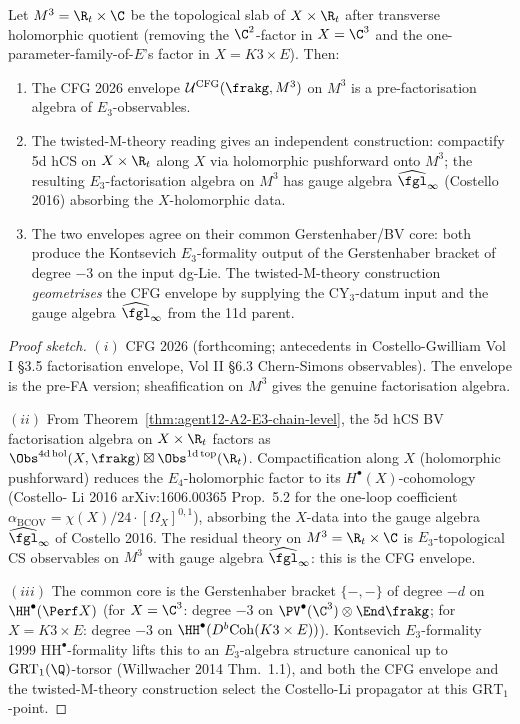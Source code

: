 \begin{proposition}
\label{prop:agent12-A6-cfg-coherence}
Let $M^3 = \R_t \times \C$ be the topological slab of $X \times \R_t$
after transverse holomorphic quotient (removing the $\C^2$-factor in
$X = \C^3$ and the one-parameter-family-of-$E$'s factor in
$X = K3 \times E$). Then:
\begin{enumerate}[label=\textup{(\roman*)}]
\item The CFG 2026 envelope $\mathcal{U}^{\mathrm{CFG}}(\frakg, M^3)$ on
$M^3$ is a pre-factorisation algebra of $E_3$-observables.
\item The twisted-M-theory reading gives an independent construction:
compactify 5d hCS on $X \times \R_t$ along $X$ via holomorphic
pushforward onto $M^3$; the resulting $E_3$-factorisation algebra on
$M^3$ has gauge algebra $\widehat{\fgl}_\infty$ (Costello 2016) absorbing
the $X$-holomorphic data.
\item The two envelopes agree on their common Gerstenhaber/BV core:
both produce the Kontsevich $E_3$-formality output of the Gerstenhaber
bracket of degree $-3$ on the input dg-Lie. The twisted-M-theory
construction \emph{geometrises} the CFG envelope by supplying the
CY$_3$-datum input and the gauge algebra $\widehat{\fgl}_\infty$
from the 11d parent.
\end{enumerate}
\end{proposition}

\begin{proof}[Proof sketch]
$(i)$ CFG 2026 (forthcoming; antecedents in Costello-Gwilliam Vol I
\S3.5 factorisation envelope, Vol II \S6.3 Chern-Simons observables).
The envelope is the pre-FA version; sheafification on $M^3$ gives the
genuine factorisation algebra.

$(ii)$ From Theorem~\ref{thm:agent12-A2-E3-chain-level}, the
5d hCS BV factorisation algebra on $X \times \R_t$ factors as
$\Obs^{4\mathrm{d\,hol}}(X, \frakg) \boxtimes \Obs^{1\mathrm{d\,top}}
(\R_t)$. Compactification along $X$ (holomorphic pushforward) reduces
the $E_4$-holomorphic factor to its $H^\bullet(X)$-cohomology (Costello-
Li 2016 arXiv:1606.00365 Prop.~5.2 for the one-loop coefficient
$\alpha_{\mathrm{BCOV}} = \chi(X)/24 \cdot [\Omega_X]^{0,1}$), absorbing
the $X$-data into the gauge algebra $\widehat{\fgl}_\infty$ of
Costello 2016. The residual theory on $M^3 = \R_t \times \C$ is
$E_3$-topological CS observables on $M^3$ with gauge algebra
$\widehat{\fgl}_\infty$: this is the CFG envelope.

$(iii)$ The common core is the Gerstenhaber bracket $\{-,-\}$ of
degree $-d$ on $\HH^\bullet(\Perf X)$ (for $X = \C^3$: degree $-3$ on
$\PV^\bullet(\C^3) \otimes \End \frakg$; for $X = K3 \times E$:
degree $-3$ on $\HH^\bullet(D^b\mathrm{Coh}(K3 \times E))$). Kontsevich
$E_3$-formality 1999 $\mathrm{HH}^\bullet$-formality lifts this to
an $E_3$-algebra structure canonical up to $\mathrm{GRT}_1(\Q)$-torsor
(Willwacher 2014 Thm.~1.1), and both the CFG envelope and the
twisted-M-theory construction select the Costello-Li propagator at
this $\mathrm{GRT}_1$-point.
\end{proof}

